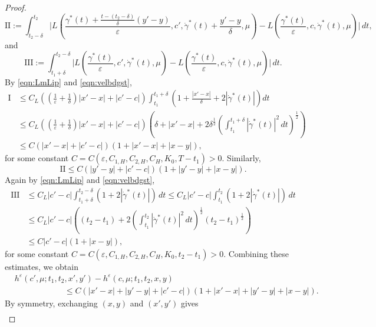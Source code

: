 \documentclass[reqno,11pt]{amsart}
\numberwithin{equation}{section}
\newcommand{\e}{\varepsilon}
\newcommand{\ep}{\varepsilon}
\begin{document}
\begin{proof}
\[
\mathrm{II}
:=\int_{t_2-\delta}^{t_2}
\Bigg|
L\left(
\frac{
\gamma^\ast(t)
+\frac{t-(t_2-\delta)}{\delta}(y'-y)
}{\ep},c',
\dot{\gamma}^\ast(t)+\frac{y'-y}{\delta},\mu
\right)
- L\left(
\frac{\gamma^\ast(t)}{\ep},c,
\dot{\gamma}^\ast(t), \mu
\right)
\Bigg|\,dt,
\]
and
\[
\mathrm{III}:=\int_{t_1+\delta}^{t_2-\delta}
\Bigg|
L\left(
\frac{
\gamma^\ast(t)}{\ep},c',\dot{\gamma}^\ast(t),\mu
\right)- L\left(
\frac{\gamma^\ast(t)}{\ep},c,
\dot{\gamma}^\ast(t),\mu
\right)
\Bigg|\,dt.
\]
By \eqref{eqn:LmLip} and  \eqref{eqn:velbdgst},
\[
\begin{aligned}
\mathrm{I} &\leq C_L \left(\left(\frac{1}{\ep}+\frac{1}{\delta}\right) \left|x'-x\right| +|c'-c|\right) \int_{t_1}^{t_1+\delta} \left(1+\frac{|x'-x|}{\delta}+2\left|\dot{\gamma}^\ast(t)\right|\right)dt\\
&\leq  C_L \left(\left(\frac{1}{\ep}+\frac{1}{\delta}\right) \left|x'-x\right| +|c'-c|\right)\left(\delta +|x'-x|+2\delta^\frac{1}{2} \left(\int_{t_1}^{t_1+\delta}\left|\dot{\gamma}^\ast(t)\right|^2 \,dt\right)^\frac{1}{2} \right)\\
&\leq C\left(\left|x'-x\right|+|c'-c|\right)\left(1+\left|x'-x\right|+|x-y|\right),
\end{aligned}
\]
for some constant $C=C(\ep,C_{1,H}, C_{2, H}, C_H, K_0, T-t_1)>0$.
Similarly,
\[
\mathrm{II}\leq C\left(\left|y'-y\right|+|c'-c|\right)\left(1+\left|y'-y\right|+|x-y|\right).
\]
Again by \eqref{eqn:LmLip} and  \eqref{eqn:velbdgst},
\[
\begin{aligned}
\mathrm{III} &\leq C_L |c'-c| \int_{t_1+\delta}^{t_2-\delta}\left(1+2\left|\dot{\gamma}^\ast(t)\right|\right) \,dt \leq C_L |c'-c| \int_{t_1}^{t_2}\left(1+2\left|\dot{\gamma}^\ast(t)\right|\right) \,dt \\
& \leq C_L |c'-c| \left((t_2-t_1)+2\left(\int_{t_1}^{t_2}\left|\dot{\gamma}^\ast(t)\right|^2\,dt\right)^\frac{1}{2}(t_2-t_1)^\frac{1}{2}\right)\\
& \leq C|c'-c|\left(1+|x-y|\right),
\end{aligned}
\]
for some constant $C=C(\ep,C_{1,H}, C_{2, H}, C_H, K_0, t_2-t_1)>0$.
Combining these estimates, we obtain
\[
\begin{aligned}
&h^\e (c',\mu;t_1,t_2, x',y')-h^\e (c,\mu;t_1,t_2, x,y)\\
&\qquad \qquad\qquad\leq C \left(\left|x'-x\right|+\left|y'-y\right|+|c'-c|\right)\left(1+\left|x'-x\right|+\left|y'-y\right|+|x-y|\right).
\end{aligned}
\]
By symmetry, exchanging $(x, y)$ and $(x', y')$ gives
\[
\begin{aligned}

\end{aligned}\]
\end{proof}
\end{document}
